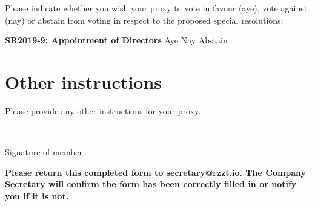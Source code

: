 \documentclass[a4paper,10pt]{article}
\begin{document}
\begin{Form}
Please indicate whether you wish your proxy to vote in favour (aye), vote against (nay) or abstain from voting in respect to the proposed special resolutions:

\textbf{SR2019-9: Appointment of Directors} \hfill
\ChoiceMenu[radio,radiosymbol=\ding{108},name=sr1]{ }{ }Aye
\ChoiceMenu[radio,radiosymbol=\ding{108},name=sr1]{ }{ }Nay
\ChoiceMenu[radio,radiosymbol=\ding{108},name=sr1]{ }{ }Abstain

\section{Other instructions}

Please provide any other instructions for your proxy.

\begin{framed}%
  \TextField[width=\textwidth,donotscroll=true,multiline=true,name=instructions]{ }%
\end{framed}%

\vspace{1in}
\rule{0.5\textwidth}{0.5pt}\\
Signature of member

\vspace{1in}

\textbf{Please return this completed form to secretary@rzzt.io. The Company Secretary will confirm the form has been correctly filled in or notify you if it is not.}

\end{Form}
\end{document}
